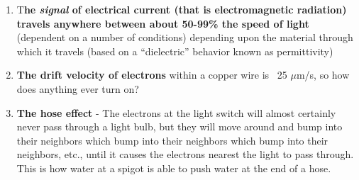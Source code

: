 \documentclass[11pt]{book}
\begin{document}
\begin{enumerate}
	\item T\textbf{he \textit{signal} of electrical current (that is electromagnetic radiation) travels anywhere between about 50-99\% the speed of light} (dependent on a number of conditions) depending upon the material through which it travels (based on a “dielectric” behavior known as permittivity)
	\item \textbf{The drift velocity of electrons} within a copper wire is ~25 $\mu$m/s, so how does anything ever turn on?
	\item \textbf{The hose effect} - The electrons at the light switch will almost certainly never pass through a light bulb, but they will move around and bump into their neighbors which bump into their neighbors which bump into their neighbors, etc., until it causes the electrons nearest the light to pass through. This is how water at a spigot is able to push water at the end of a hose.
\end{enumerate}
\end{document}
